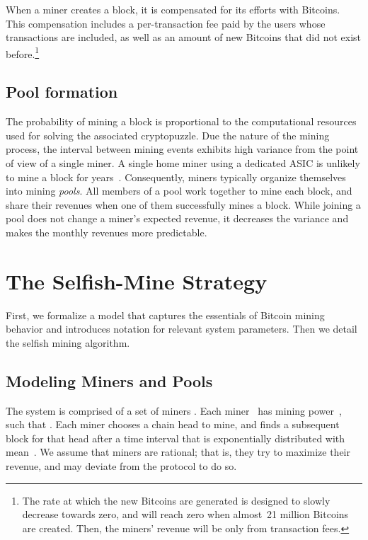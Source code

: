 \documentclass[letterpaper]{llncs}
\newcommand{\negspace}{\vspace{-0.5\baselineskip}}
\begin{document}
When a miner creates a block, it is compensated for its efforts with Bitcoins. This compensation includes a per-transaction fee paid by the users whose transactions are included, as well as an amount of new Bitcoins that did not exist before.\footnote{The rate at which the new Bitcoins are generated is designed to slowly decrease towards zero, and will reach zero when almost~21 million Bitcoins are created. Then, the miners' revenue will be only from transaction fees. }

        \subsection{Pool formation} 
\negspace
        
The probability of mining a block is proportional to the computational resources used for solving the associated cryptopuzzle.
Due the nature of the mining process, the interval between mining events exhibits high variance from the point of view of a single miner. 
A single home miner using a dedicated ASIC is unlikely to mine a block for years~\cite{swanson2013calculator}. 
Consequently, miners typically organize themselves into mining \emph{pools}. 
All members of a pool work together to mine each block, and share their revenues when one of them successfully mines a block. 
While joining a pool does not change a miner's expected revenue, it decreases the variance and makes the monthly revenues more predictable. 



    \section{The Selfish-Mine Strategy} \label{sec:algo}

First, we formalize a model that captures the essentials of Bitcoin mining behavior and introduces notation for relevant system parameters. Then we detail the selfish mining algorithm. 

        \subsection{Modeling Miners and Pools} 

The system is comprised of a set of miners . Each miner~ has mining power~, such that . Each miner chooses a chain head to mine, and finds a subsequent block for that head after a time interval that is exponentially distributed with mean~. We assume that miners are rational; that is, they try to maximize their revenue, and may deviate from the protocol to do so. 
\end{document}
